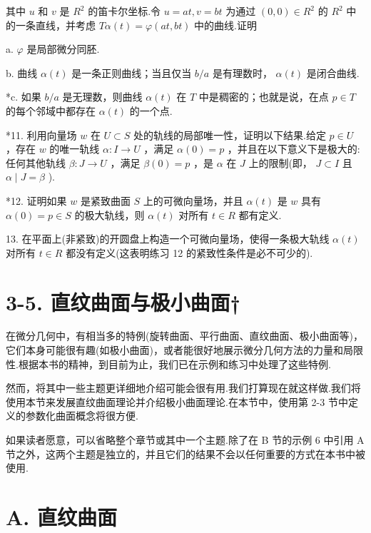 其中 \(u\) 和 \(v\) 是 \({R}^{2}\) 的笛卡尔坐标.令 \(u = {at},v = {bt}\) 为通过 \(\left( {0,0}\right)  \in  {R}^{2}\) 的 \({R}^{2}\) 中的一条直线，并考虑 \({T\alpha }\left( t\right)  = \varphi \left( {{at},{bt}}\right)\) 中的曲线.证明

a. \(\varphi\) 是局部微分同胚.

b. 曲线 \(\alpha \left( t\right)\) 是一条正则曲线；当且仅当 \(b/a\) 是有理数时， \(\alpha \left( t\right)\) 是闭合曲线.

*c. 如果 \(b/a\) 是无理数，则曲线 \(\alpha \left( t\right)\) 在 \(T\) 中是稠密的；也就是说，在点 \(p \in  T\) 的每个邻域中都存在 \(\alpha \left( t\right)\) 的一个点.

*11. 利用向量场 \(w\) 在 \(U \subset  S\) 处的轨线的局部唯一性，证明以下结果.给定 \(p \in  U\) ，存在 \(w\) 的唯一轨线 \(\alpha  : I \rightarrow  U\) ，满足 \(\alpha \left( 0\right)  = p\) ，并且在以下意义下是极大的:任何其他轨线 \(\beta  : J \rightarrow  U\) ，满足 \(\beta \left( 0\right)  = p\) ，是 \(\alpha\) 在 \(J\) 上的限制(即， \(J \subset  I\) 且 \(\alpha  \mid  J = \beta\) ).

*12. 证明如果 \(w\) 是紧致曲面 \(S\) 上的可微向量场，并且 \(\alpha \left( t\right)\) 是 \(w\) 具有 \(\alpha \left( 0\right)  = p \in  S\) 的极大轨线，则 \(\alpha \left( t\right)\) 对所有 \(t \in  R\) 都有定义.

13. 在平面上(非紧致)的开圆盘上构造一个可微向量场，使得一条极大轨线 \(\alpha \left( t\right)\) 对所有 \(t \in  R\) 都没有定义(这表明练习 12 的紧致性条件是必不可少的).

\section*{3-5. 直纹曲面与极小曲面†}

在微分几何中，有相当多的特例(旋转曲面、平行曲面、直纹曲面、极小曲面等)，它们本身可能很有趣(如极小曲面)，或者能很好地展示微分几何方法的力量和局限性.根据本书的精神，到目前为止，我们已在示例和练习中处理了这些特例.

然而，将其中一些主题更详细地介绍可能会很有用.我们打算现在就这样做.我们将使用本节来发展直纹曲面理论并介绍极小曲面理论.在本节中，使用第 2-3 节中定义的参数化曲面概念将很方便.

如果读者愿意，可以省略整个章节或其中一个主题.除了在 B 节的示例 6 中引用 A 节之外，这两个主题是独立的，并且它们的结果不会以任何重要的方式在本书中被使用.

\section*{A. 直纹曲面}

